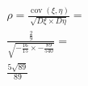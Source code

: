 \documentclass[12pt]{article}
\DeclareMathOperator{\cov}{cov}
\begin{document}
\begin{enumerate}
	      \begin{gather*}
		      \rho = \frac{\cov(\xi, \eta)}{\sqrt{D\xi \times D\eta}} = \\
		      \frac{\frac{2}{9}}{\sqrt{-\frac{16}{15} \times -\frac{89}{540}}} = \\
		      \frac{5\sqrt{89}}{89}
	      \end{gather*}

\end{enumerate}
\end{document}
